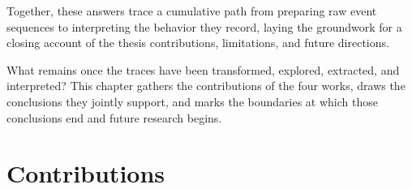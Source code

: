 Together, these answers trace a cumulative path from preparing raw event sequences to interpreting the behavior they record, laying the groundwork for a closing account of the thesis contributions, limitations, and future directions.




\label{cha:conclusions}

What remains once the traces have been transformed, explored, extracted, and interpreted?
This chapter gathers the contributions of the four works, draws the conclusions they jointly support, and marks the boundaries at which those conclusions end and future research begins.










\section{Contributions}

